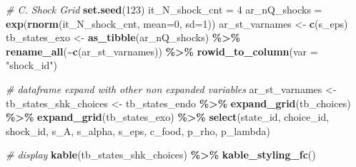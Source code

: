 \documentclass[
]{book}
\newenvironment{Shaded}{\begin{snugshade}}{\end{snugshade}}
\newcommand{\CommentTok}[1]{\textcolor[rgb]{0.56,0.35,0.01}{\textit{#1}}}
\newcommand{\DataTypeTok}[1]{\textcolor[rgb]{0.13,0.29,0.53}{#1}}
\newcommand{\DecValTok}[1]{\textcolor[rgb]{0.00,0.00,0.81}{#1}}
\newcommand{\KeywordTok}[1]{\textcolor[rgb]{0.13,0.29,0.53}{\textbf{#1}}}
\newcommand{\NormalTok}[1]{#1}
\newcommand{\OperatorTok}[1]{\textcolor[rgb]{0.81,0.36,0.00}{\textbf{#1}}}
\newcommand{\StringTok}[1]{\textcolor[rgb]{0.31,0.60,0.02}{#1}}
\begin{document}
\begin{Shaded}
\begin{Highlighting}[]
\CommentTok{\# C. Shock Grid}
\KeywordTok{set.seed}\NormalTok{(}\DecValTok{123}\NormalTok{)}
\NormalTok{it\_N\_shock\_cnt =}\StringTok{ }\DecValTok{4}
\NormalTok{ar\_nQ\_shocks =}\StringTok{ }\KeywordTok{exp}\NormalTok{(}\KeywordTok{rnorm}\NormalTok{(it\_N\_shock\_cnt, }\DataTypeTok{mean=}\DecValTok{0}\NormalTok{, }\DataTypeTok{sd=}\DecValTok{1}\NormalTok{))}
\NormalTok{ar\_st\_varnames \textless{}{-}}\StringTok{ }\KeywordTok{c}\NormalTok{(}\StringTok{\textquotesingle{}s\_eps\textquotesingle{}}\NormalTok{)}
\NormalTok{tb\_states\_exo \textless{}{-}}\StringTok{ }\KeywordTok{as\_tibble}\NormalTok{(ar\_nQ\_shocks) }\OperatorTok{\%\textgreater{}\%}\StringTok{ }
\StringTok{  }\KeywordTok{rename\_all}\NormalTok{(}\OperatorTok{\textasciitilde{}}\KeywordTok{c}\NormalTok{(ar\_st\_varnames)) }\OperatorTok{\%\textgreater{}\%}\StringTok{ }
\StringTok{  }\KeywordTok{rowid\_to\_column}\NormalTok{(}\DataTypeTok{var =} \StringTok{"shock\_id"}\NormalTok{) }

\CommentTok{\# dataframe expand with other non expanded variables}
\NormalTok{ar\_st\_varnames \textless{}{-}}\StringTok{ }
\NormalTok{tb\_states\_shk\_choices \textless{}{-}}\StringTok{ }\NormalTok{tb\_states\_endo }\OperatorTok{\%\textgreater{}\%}\StringTok{ }
\StringTok{  }\KeywordTok{expand\_grid}\NormalTok{(tb\_choices) }\OperatorTok{\%\textgreater{}\%}\StringTok{ }
\StringTok{  }\KeywordTok{expand\_grid}\NormalTok{(tb\_states\_exo) }\OperatorTok{\%\textgreater{}\%}\StringTok{ }
\StringTok{  }\KeywordTok{select}\NormalTok{(state\_id, choice\_id, shock\_id, }
\NormalTok{         s\_A, s\_alpha, s\_eps, c\_food,}
\NormalTok{         p\_rho, p\_lambda)}
  
\CommentTok{\# display}
\KeywordTok{kable}\NormalTok{(tb\_states\_shk\_choices) }\OperatorTok{\%\textgreater{}\%}\StringTok{ }\KeywordTok{kable\_styling\_fc}\NormalTok{()}
\end{Highlighting}
\end{Shaded}
\end{document}

